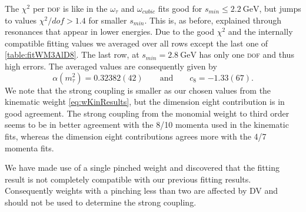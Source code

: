 \documentclass[../../index.tex]{subfiles}
\begin{document}
The $\chi^2$ per \textsc{dof} is like in the $\omega_\tau$ and $\omega_{cubic}$
fits good for $s_{min}\leq \SI{2.2}{\giga\eV}$, but jumps to values
$\chi^2/dof>1.4$ for smaller $s_{min}$. This is, as before, explained through
resonances that appear in lower energies. Due to the good $\chi^2$ and the
internally compatible fitting values we averaged over all rows except the last
one of \cref{table:fitWM3AlD8}. The last row, at $s_{min}=\SI{2.8}{\giga\eV}$
has only one \textsc{dof} and thus high errors. The averaged values are
consequently given by 
\begin{equation}
  \alpha(m_\tau^2) = 0.32382(42) \qquad \text{and} \qquad c_8=-1.33(67).
\end{equation}
We note that the strong coupling is smaller as our chosen values from the
kinematic weight \cref{eq:wKinResults}, but the dimension eight contribution
is in good agreement. The strong coupling from the monomial weight to third
order seems to be in better agreement with the 8\-/10 momenta used in the kinematic fits, whereas
the dimension eight contributions agrees more with the 4\-/7 momenta fits.

We have made use of a single pinched weight and discovered that the fitting
result is not completely compatible with our previous fitting results.
Consequently weights with a pinching less than two are affected by \textsc{DV}
and should not be used to determine the strong coupling.
\end{document}
